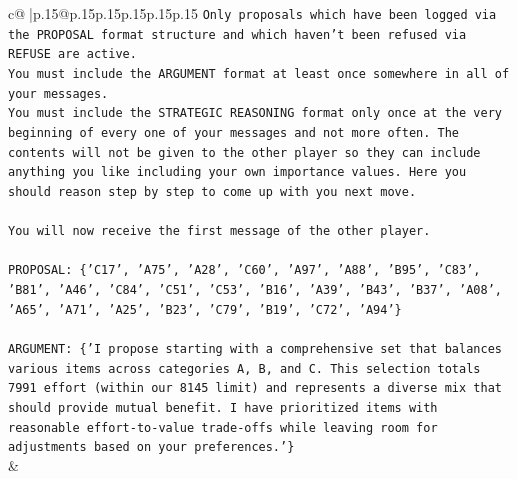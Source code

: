 \documentclass{article}
\begin{document}
{\begin{supertabular}{c@{$\;$}|p{.15\linewidth}@{}p{.15\linewidth}p{.15\linewidth}p{.15\linewidth}p{.15\linewidth}p{.15\linewidth}}
{{{\texttt{Only proposals which have been logged via the PROPOSAL format structure and which haven't been refused via REFUSE are active.} \\
\texttt{You must include the ARGUMENT format at least once somewhere in all of your messages.} \\
\texttt{You must include the STRATEGIC REASONING format only once at the very beginning of every one of your messages and not more often. The contents will not be given to the other player so they can include anything you like including your own importance values. Here you should reason step by step to come up with you next move.} \\
\\ 
\texttt{You will now receive the first message of the other player.} \\
\\ 
\texttt{PROPOSAL: \{'C17', 'A75', 'A28', 'C60', 'A97', 'A88', 'B95', 'C83', 'B81', 'A46', 'C84', 'C51', 'C53', 'B16', 'A39', 'B43', 'B37', 'A08', 'A65', 'A71', 'A25', 'B23', 'C79', 'B19', 'C72', 'A94'\}} \\
\\ 
\texttt{ARGUMENT: \{'I propose starting with a comprehensive set that balances various items across categories A, B, and C. This selection totals 7991 effort (within our 8145 limit) and represents a diverse mix that should provide mutual benefit. I have prioritized items with reasonable effort{-}to{-}value trade{-}offs while leaving room for adjustments based on your preferences.'\}} \\
            }
        }
    }
    & \\ \\


\end{supertabular}}
\end{document}
